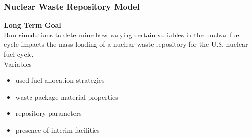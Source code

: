 \begin{frame}
    \frametitle{Nuclear Waste Repository Model}
        \textbf{Long Term Goal}
        \\

        Run simulations to determine how varying certain variables in the nuclear fuel cycle impacts the mass loading of a nuclear waste repository for the U.S. nuclear fuel cycle. 
        \\

        Variables 
        \begin{itemize}
            \item used fuel allocation strategies
            \item waste package material properties 
            \item repository parameters
            \item presence of interim facilities
        \end{itemize}
\end{frame}
  